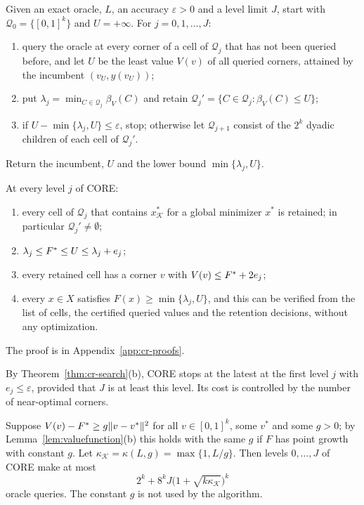 \begin{algorithm}\label{alg:core}
Given an exact oracle, $L$, an accuracy $\varepsilon>0$ and a level limit
$J$, start with $\mathcal Q_0=\{[0,1]^k\}$ and $U=+\infty$. For
$j=0,1,\dots,J$:
\begin{enumerate}[label=(\roman*)]
\item query the oracle at every corner of a cell of $\mathcal Q_j$ that has
not been queried before, and let $U$ be the least value $V(v)$ of all
queried corners, attained by the incumbent $(v_U,y(v_U))$;
\item put $\lambda_j=\min_{C\in\mathcal Q_j}\beta_V(C)$ and retain
$\mathcal Q_j'=\{C\in\mathcal Q_j:\beta_V(C)\le U\}$;
\item if $U-\min\{\lambda_j,U\}\le\varepsilon$, stop; otherwise let
$\mathcal Q_{j+1}$ consist of the $2^k$ dyadic children of each cell of
$\mathcal Q_j'$.
\end{enumerate}
Return the incumbent, $U$ and the lower bound $\min\{\lambda_j,U\}$.
\end{algorithm}

\begin{theorem}\label{thm:cr-search}
At every level $j$ of CORE:
\begin{enumerate}[label=(\alph*)]
\item every cell of $\mathcal Q_j$ that contains $x^*_{\mathcal K}$ for a
global minimizer $x^*$ is retained; in particular $\mathcal Q_j'\ne\emptyset$;
\item $\lambda_j\le F^{*}\le U\le\lambda_j+e_j$;
\item every retained cell has a corner $v$ with $V(v)\le F^{*}+2e_j$;
\item every $x\in X$ satisfies $F(x)\ge\min\{\lambda_j,U\}$, and this can be
verified from the list of cells, the certified queried values and the
retention decisions, without any optimization.
\end{enumerate}
\end{theorem}

The proof is in Appendix~\ref{app:cr-proofs}.

By Theorem~\ref{thm:cr-search}(b), CORE stops at the latest at the first
level $j$ with $e_j\le\varepsilon$, provided that $J$ is at least this
level. Its cost is controlled by the number of near-optimal corners.

\begin{proposition}\label{prop:cr-growth}
Suppose $V(v)-F^{*}\ge g\lVert v-v^*\rVert^2$ for all $v\in[0,1]^k$, some $v^*$
and some $g>0$; by Lemma~\ref{lem:valuefunction}(b) this holds with the same
$g$ if $F$ has point growth with constant $g$. Let
$\kappa_{\mathcal K}=\kappa(L,g)=\max\{1,L/g\}$. Then levels $0,\dots,J$ of
CORE make at most
\[
2^k+8^kJ\bigl(1+\sqrt{k\kappa_{\mathcal K}}\bigr)^k
\]
oracle queries. The constant $g$ is not used by the algorithm.
\end{proposition}

